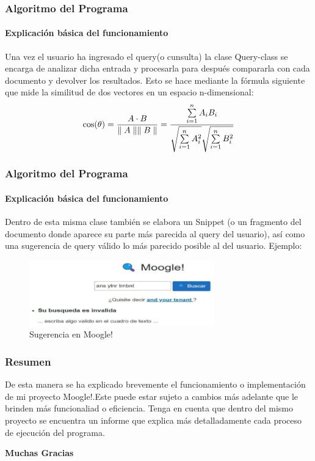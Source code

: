 \documentclass{beamer}
\begin{document}
\begin{frame}
\frametitle{Algoritmo del Programa}
\framesubtitle{Explicación básica del funcionamiento}
Una vez el usuario ha ingresado el query(o cunsulta) la clase Query-class se encarga de analizar dicha entrada y procesarla para después compararla con cada documento y devolver los resultados. Esto se hace mediante la fórmula siguiente que mide la similitud de dos vectores en un espacio n-dimensional:
\begin{equation}
\cos(\theta) = \frac{A\cdot B}{\parallel A\parallel \* \parallel B\parallel}= \frac{\sum\limits_{i=1}^n A_i\* B_i}{\sqrt{\sum\limits_{i=1}^n A_i^2}\* \sqrt{\sum\limits_{i=1}^n B_i^2}}
\end{equation}
\end{frame}

\begin{frame}
\frametitle{Algoritmo del Programa}
\framesubtitle{Explicación básica del funcionamiento}
Dentro de esta misma clase también se elabora un Snippet (o un fragmento del documento donde aparece su parte más parecida al query del usuario), así como una sugerencia de query válido lo más parecido posible al del usuario. Ejemplo:
\begin{figure}[h]
    \center
    \includegraphics[width=8cm]{suggestion.png}
    \caption{Sugerencia en Moogle!}
    \label{fig:suggestion}
\end{figure}
\end{frame}

\begin{frame}
  \frametitle{Resumen}
  De esta manera se ha explicado brevemente el funcionamiento o implementación de mi proyecto Moogle!.Este puede estar sujeto a cambios más adelante que le brinden más funcionaliad o eficiencia. Tenga en cuenta que dentro del mismo proyecto se encuentra un informe que explica más detalladamente cada proceso de ejecución del programa.
\end{frame}
\maketitle
\begin{frame}
\center
\Huge\textbf{Muchas Gracias}
\end{frame}
\end{document}
